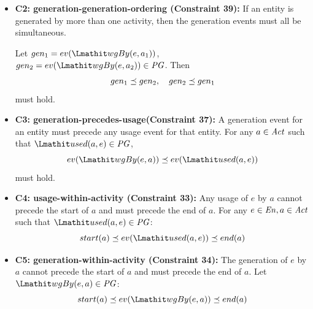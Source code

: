 \begin{itemize}
	
	\item\textbf{C2: generation-generation-ordering (Constraint 39):}  If an entity is generated by more than one activity, then the generation events must all be simultaneous.
	
	Let 
	$gen_1 = ev(\wgby(e, a_1))$, $gen_2 = ev(\wgby(e, a_2)) \in \pg$. Then  \[gen_1  \preceq  gen_2, \quad gen_2 \preceq gen_1\] must hold.
	
	\item\textbf{C3: generation-precedes-usage(Constraint 37):} A generation event for an entity must precede any usage event for that entity.
	For any $a \in \mathit{Act}$ such that $\used(a,e) \in \pg$, \[	ev(\wgby(e, a)) \preorder ev(\used(a,e))\] must hold.
	
	
	
%	
	
	\item\textbf{C4: usage-within-activity (Constraint 33):} Any usage of $e$ by $a$ cannot precede the start of $a$ and must precede the end of $a$. For any $e\in \mathit{En}, a \in \mathit{Act}$ such that $\used(a,e) \in \pg$:
	\[start(a) \preorder ev(\used(a,e))   \preorder end(a)\]
	
	\item\textbf{C5: generation-within-activity (Constraint 34):} The generation of $e$ by $a$ cannot precede the start of $a$ and must precede the end of $a$.
	Let $\wgby(e,a) \in \pg$:
	\[ start(a) \preorder ev(\wgby(e,a))  \preorder end(a)\]
	

\end{itemize}

